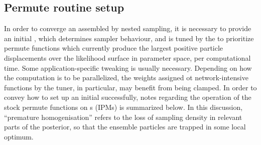 \subsection{Permute routine setup}
In order to converge an assembled  by nested sampling, it is necessary to provide an initial , which determines sampler behaviour, and is tuned by the  to prioritize permute functions which currently produce the largest positive particle displacements over the likelihood surface in parameter space, per computational time. Some application-specific tweaking is usually necessary. Depending on how the computation is to be parallelized, the weights assigned ot network-intensive functions by the tuner, in particular, may benefit from being clamped. In order to convey how to set up an initial  successfully, notes regarding the operation of the stock permute functions on s (IPMs) is summarized below. In this discussion, ``premature homogenisation'' refers to the loss of sampling density in relevant parts of the posterior, so that the ensemble particles are trapped in some local optimum.

